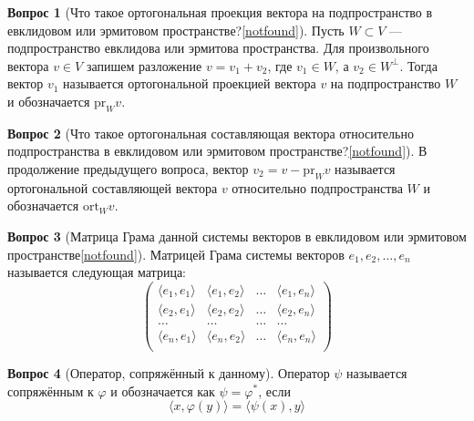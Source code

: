 \documentclass[a4paper,11pt]{article}
\theoremstyle{remark}
\theoremstyle{definition}
\newtheorem{question}{Вопрос}
\begin{document}
\begin{question}[Что такое ортогональная проекция вектора на подпространство в евклидовом или эрмитовом пространстве?\cref{notfound}]
Пусть \(W \subset V\) --- подпространство евклидова или эрмитова пространства. Для произвольного вектора \(v \in V\) запишем разложение \(v = v_1 + v_2\), где \(v_1 \in W\), а \(v_2 \in W^{\bot}\). Тогда вектор \(v_1\) называется ортогональной проекцией вектора \(v\) на подпространство \(W\) и обозначается \(\mathrm{pr}_Wv\).
\end{question}


\begin{question}[Что такое ортогональная составляющая вектора относительно подпространства в евклидовом или эрмитовом пространстве?\cref{notfound}]
В продолжение предыдущего вопроса, вектор \(v_2 = v - \mathrm{pr}_Wv\) называется ортогональной составляющей вектора \(v\) относительно подпространства \(W\) и обозначается \(\mathrm{ort}_Wv\).
\end{question}


\begin{question}[Матрица Грама данной системы векторов в евклидовом или эрмитовом пространстве\cref{notfound}]
Матрицей Грама системы векторов \(e_1, e_2, \dots, e_n\) называется следующая матрица:
\begin{equation*}
	\begin{pmatrix}
		\langle e_1, e_1 \rangle & \langle e_1, e_2 \rangle & \dots & \langle e_1, e_n \rangle \\
		\langle e_2, e_1 \rangle & \langle e_2, e_2 \rangle & \dots & \langle e_2, e_n \rangle \\
		\dots & \dots & \dots & \dots \\
		\langle e_n, e_1 \rangle & \langle e_n, e_2 \rangle & \dots & \langle e_n, e_n \rangle \\
	\end{pmatrix}
\end{equation*}
\end{question}





\begin{question}[Оператор, сопряжённый к данному]
Оператор \(\psi\) называется сопряжённым к \(\varphi\) и обозначается как \(\psi = \varphi^*\), если
\begin{equation*}
	\langle x, \varphi(y) \rangle = \langle \psi(x), y \rangle
\end{equation*}
\end{question}
\end{document}
